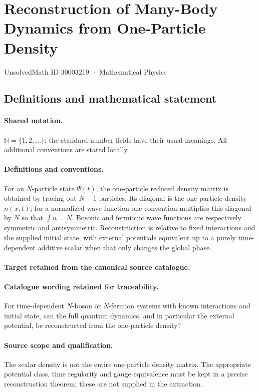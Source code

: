 \documentclass[11pt]{article}
\begin{document}
\setcounter{section}{30003218}
\section{Reconstruction of Many-Body Dynamics from One-Particle Density}\label{30003219}
{\small UnsolvedMath ID 30003219 · Mathematical Physics}
\subsection{Definitions and mathematical statement}

\paragraph{Shared notation.}$\mathbb N=\{1,2,\ldots\}$; the standard number fields have their usual meanings. All additional conventions are stated locally.


\paragraph{Definitions and conventions.}
For an $N$-particle state $\Psi(t)$, the one-particle reduced density matrix is obtained by tracing out $N-1$ particles. Its diagonal is the one-particle density $n(x,t)$; for a normalized wave function one convention multiplies this diagonal by $N$ so that $\int n=N$. Bosonic and fermionic wave functions are respectively symmetric and antisymmetric. Reconstruction is relative to fixed interactions and the supplied initial state, with external potentials equivalent up to a purely time-dependent additive scalar when that only changes the global phase.

\paragraph{Target retained from the canonical source catalogue.}
\paragraph{Catalogue wording retained for traceability.}
For time-dependent $N$-boson or $N$-fermion systems with known interactions and initial state, can the full quantum dynamics, and in particular the external potential, be reconstructed from the one-particle density?

\paragraph{Source scope and qualification.}
The scalar density is not the entire one-particle density matrix. The appropriate potential class, time regularity and gauge equivalence must be kept in a precise reconstruction theorem; these are not supplied in the extraction.
\end{document}
